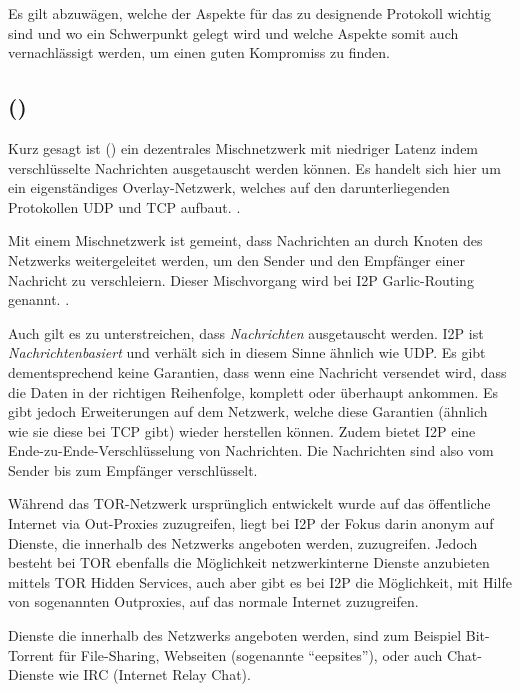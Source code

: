 Es gilt abzuwägen, welche der Aspekte für das zu designende Protokoll wichtig sind und wo ein Schwerpunkt gelegt wird und welche Aspekte somit auch vernachlässigt werden, um einen guten Kompromiss zu finden. \parencite{das_anonymity_2018}

\subsection{ ()}

Kurz gesagt ist  () ein dezentrales Mischnetzwerk mit niedriger Latenz indem verschlüsselte Nachrichten ausgetauscht werden können.
\parencite{zantout_i2p_2011}
Es handelt sich hier um ein eigenständiges Overlay-Netzwerk, welches auf den darunterliegenden Protokollen UDP und TCP aufbaut.  \parencite{de_boer_invisible_2019,astolfi_i2p_2015}.

Mit einem Mischnetzwerk ist gemeint, dass Nachrichten an durch Knoten des Netzwerks weitergeleitet werden, um den Sender und den Empfänger einer Nachricht zu verschleiern. Dieser Mischvorgang wird bei I2P Garlic-Routing genannt.
\parencite[S.~1]{zantout_i2p_2011}.

Auch gilt es zu unterstreichen, dass \textit{Nachrichten} ausgetauscht werden.
I2P ist \textit{Nachrichtenbasiert} und verhält sich in diesem Sinne ähnlich wie UDP.
Es gibt dementsprechend keine Garantien, dass wenn eine Nachricht versendet wird, dass die Daten in der richtigen Reihenfolge, komplett oder überhaupt ankommen.
Es gibt jedoch Erweiterungen auf dem Netzwerk, welche diese Garantien (ähnlich wie sie diese bei TCP gibt) wieder herstellen können.
Zudem bietet I2P eine Ende-zu-Ende-Verschlüsselung von Nachrichten.
Die Nachrichten sind also vom Sender bis zum Empfänger verschlüsselt.

Während das TOR-Netzwerk ursprünglich entwickelt wurde auf das öffentliche Internet via Out-Proxies zuzugreifen,
liegt bei I2P der Fokus darin anonym auf Dienste, die innerhalb des Netzwerks angeboten werden, zuzugreifen.
Jedoch besteht bei TOR ebenfalls die Möglichkeit netzwerkinterne Dienste anzubieten mittels TOR Hidden Services, auch aber gibt es bei I2P die Möglichkeit, mit Hilfe von sogenannten Outproxies, auf das normale Internet zuzugreifen.

Dienste die innerhalb des Netzwerks angeboten werden, sind zum Beispiel Bit-Torrent für File-Sharing, Webseiten (sogenannte ``eepsites''), oder auch Chat-Dienste wie IRC (Internet Relay Chat).
\parencite[p.~3-4]{de_boer_invisible_2019}


